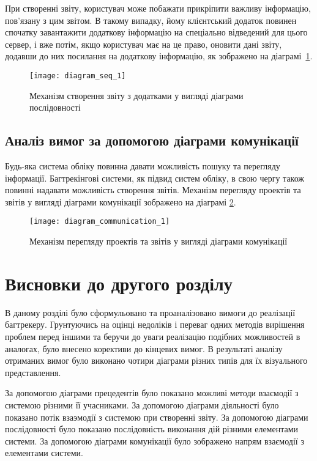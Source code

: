 \documentclass[../main.tex]{subfiles}
\begin{document}
При створенні звіту, користувач може побажати прикріпити важливу інформацію, пов'язану з цим звітом. В такому випадку, йому клієнтський додаток повинен спочатку завантажити додаткову інформацію на спеціально відведений для цього сервер, і вже потім, якщо користувач має на це право, оновити дані звіту, додавши до них посилання на додаткову інформацію, як зображено на діаграмі~\ref{figure_diag_seq_1}.

\begin{figure}[H]
	\centering
	\texttt{[image: diagram\_seq\_1]}
	\caption{Механізм створення звіту з додатками у вигляді діаграми послідовності}
	\label{figure_diag_seq_1}
\end{figure}

\subsection{Аналіз вимог за допомогою діаграми комунікації}

Будь-яка система обліку повинна давати можливість пошуку та перегляду інформації. Багтрекінгові системи, як підвид систем обліку, в свою чергу також повинні надавати можливість створення звітів. Механізм перегляду проектів та звітів у вигляді діаграми комунікації зображено на діаграмі \ref{figure_diag_comm_1}.

\begin{figure}[H]
	\centering
	\texttt{[image: diagram\_communication\_1]}
	\caption{Механізм перегляду проектів та звітів у вигляді діаграми комунікації}
	\label{figure_diag_comm_1}
\end{figure}


\section{Висновки до другого розділу}
В даному розділі було сформульовано та проаналізовано вимоги до реалізації багтрекеру. Грунтуючись на оцінці недоліків і переваг одних методів вирішення проблем перед іншими та беручи до уваги реалізацію подібних можливостей в аналогах, було внесено корективи до кінцевих вимог. В результаті аналізу отриманих вимог було виконано чотири діаграми різних типів для їх візуального представлення.

За допомогою діаграми прецедентів було показано можливі методи взаємодії з системою різними її учасниками. За допомогою діаграми діяльності було показано потік взаэмодії з системою при створенні звіту. За допомогою діаграми послідовності було показано послідовність виконання дій різними елементами системи. За допомогою діаграми комунікації було зображено напрям взаємодії з елементами системи.
\end{document}

